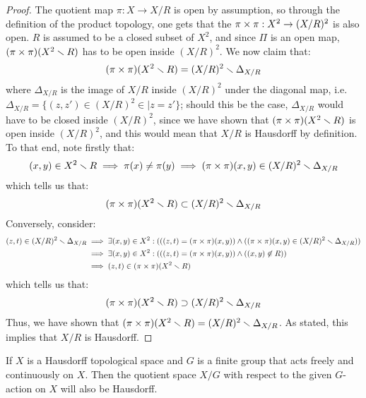     	        \begin{proof}
    	            The quotient map $\pi: X \to X/R$ is open by assumption, so through the definition of the product topology, one gets that the  $\pi \x \pi: X^2 \to (X/R)^2$ is also open. $R$ is assumed to be a closed subset of $X^2$, and since $\Pi$ is an open map, $(\pi \x \pi)(X^2 \setminus R)$ has to be open inside $(X/R)^2$. We now claim that:
    	                $$(\pi \x \pi)(X^2 \setminus R) = (X/R)^2 \setminus \Delta_{X/R}$$
    	            where $\Delta_{X/R}$ is the image of $X/R$ inside $(X/R)^2$ under the diagonal map, i.e. $\Delta_{X/R} = \{(z, z') \in (X/R)^2 \in \mid z = z'\}$; should this be the case, $\Delta_{X/R}$ would have to be closed inside $(X/R)^2$, since we have shown that $(\pi \x \pi)(X^2 \setminus R)$ is open inside $(X/R)^2$, and this would mean that $X/R$ is Hausdorff by definition. To that end, note firstly that:
    	                $$(x, y) \in X^2 \setminus R \implies \pi(x) \not = \pi(y) \implies (\pi \x \pi)(x, y) \in (X/R)^2 \setminus \Delta_{X/R}$$
                    which tells us that:
                        $$(\pi \x \pi)(X^2 \setminus R) \subset (X/R)^2 \setminus \Delta_{X/R}$$
                    Conversely, consider:
                        $$
                            \begin{aligned}
                                (z, t) \in (X/R)^2 \setminus \Delta_{X/R} & \implies \exists (x, y) \in X^2: ( ((z, t) = (\pi \x \pi)(x, y)) \wedge ((\pi \x \pi)(x, y) \in (X/R)^2 \setminus \Delta_{X/R}) )
                                \\
                                & \implies \exists (x, y) \in X^2: ( ((z, t) = (\pi \x \pi)(x, y)) \wedge ((x, y) \not \in R) )
                                \\
                                & \implies (z, t) \in (\pi \x \pi)(X^2 \setminus R)
                            \end{aligned}
                        $$
                    which tells us that:
                        $$(\pi \x \pi)(X^2 \setminus R) \supset (X/R)^2 \setminus \Delta_{X/R}$$
                    Thus, we have shown that $(\pi \x \pi)(X^2 \setminus R) = (X/R)^2 \setminus \Delta_{X/R}$. As stated, this implies that $X/R$ is Hausdorff.
    	        \end{proof}
	        \begin{corollary} \label{coro: quotients_of_hausdorff_spaces_by_free_actions_of_finite_groups_are_hausdorff}
	            If $X$ is a Hausdorff topological space and $G$ is a finite group that acts freely and continuously on $X$. Then the quotient space $X/G$ with respect to the given $G$-action on $X$ will also be Hausdorff.
	        \end{corollary}
